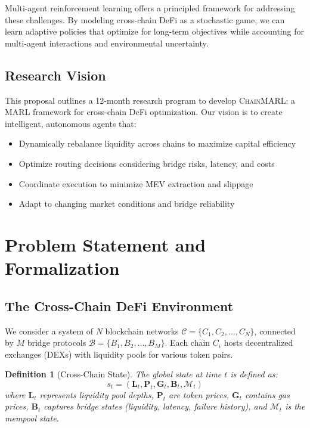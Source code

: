 \documentclass[11pt,a4paper]{article}
\newtheorem{definition}[theorem]{Definition}
\begin{document}
Multi-agent reinforcement learning offers a principled framework for addressing these challenges. By modeling cross-chain DeFi as a stochastic game, we can learn adaptive policies that optimize for long-term objectives while accounting for multi-agent interactions and environmental uncertainty.

\subsection{Research Vision}

This proposal outlines a 12-month research program to develop \textsc{ChainMARL}: a MARL framework for cross-chain DeFi optimization. Our vision is to create intelligent, autonomous agents that:
\begin{itemize}[leftmargin=2em]
    \item Dynamically rebalance liquidity across chains to maximize capital efficiency
    \item Optimize routing decisions considering bridge risks, latency, and costs
    \item Coordinate execution to minimize MEV extraction and slippage
    \item Adapt to changing market conditions and bridge reliability
\end{itemize}

\section{Problem Statement and Formalization}\label{sec:problem}

\subsection{The Cross-Chain DeFi Environment}

We consider a system of $N$ blockchain networks $\mathcal{C} = \{C_1, C_2, \ldots, C_N\}$, connected by $M$ bridge protocols $\mathcal{B} = \{B_1, B_2, \ldots, B_M\}$. Each chain $C_i$ hosts decentralized exchanges (DEXs) with liquidity pools for various token pairs.

\begin{definition}[Cross-Chain State]
The global state at time $t$ is defined as:
\begin{equation}\label{eq:state}
s_t = \left( \mathbf{L}_t, \mathbf{P}_t, \mathbf{G}_t, \mathbf{B}_t, \mathcal{M}_t \right)
\end{equation}
where $\mathbf{L}_t$ represents liquidity pool depths, $\mathbf{P}_t$ are token prices, $\mathbf{G}_t$ contains gas prices, $\mathbf{B}_t$ captures bridge states (liquidity, latency, failure history), and $\mathcal{M}_t$ is the mempool state.
\end{definition}
\end{document}
